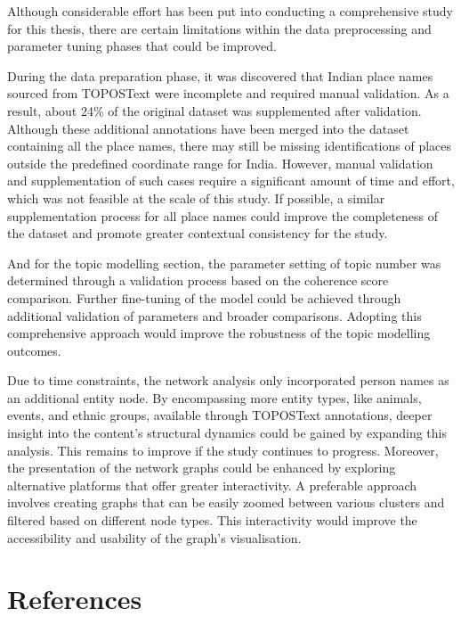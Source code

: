 \documentclass[
  12pt,
]{article}
\begin{document}
Although considerable effort has been put into conducting a
comprehensive study for this thesis, there are certain limitations
within the data preprocessing and parameter tuning phases that could be
improved.

During the data preparation phase, it was discovered that Indian place
names sourced from TOPOSText were incomplete and required manual
validation. As a result, about 24\% of the original dataset was
supplemented after validation. Although these additional annotations
have been merged into the dataset containing all the place names, there
may still be missing identifications of places outside the predefined
coordinate range for India. However, manual validation and
supplementation of such cases require a significant amount of time and
effort, which was not feasible at the scale of this study. If possible,
a similar supplementation process for all place names could improve the
completeness of the dataset and promote greater contextual consistency
for the study.

And for the topic modelling section, the parameter setting of topic
number was determined through a validation process based on the
coherence score comparison. Further fine-tuning of the model could be
achieved through additional validation of parameters and broader
comparisons. Adopting this comprehensive approach would improve the
robustness of the topic modelling outcomes.

Due to time constraints, the network analysis only incorporated person
names as an additional entity node. By encompassing more entity types,
like animals, events, and ethnic groups, available through TOPOSText
annotations, deeper insight into the content's structural dynamics could
be gained by expanding this analysis. This remains to improve if the
study continues to progress. Moreover, the presentation of the network
graphs could be enhanced by exploring alternative platforms that offer
greater interactivity. A preferable approach involves creating graphs
that can be easily zoomed between various clusters and filtered based on
different node types. This interactivity would improve the accessibility
and usability of the graph's visualisation.

\newpage

\hypertarget{references}{%
\section*{References}\label{references}}
\end{document}
